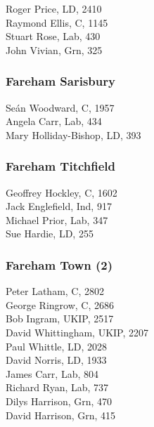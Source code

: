\documentclass[a4paper,openany,10pt]{book}
\begin{document}


Roger Price, LD, 2410\\
Raymond Ellis, C, 1145\\
Stuart Rose, Lab, 430\\
John Vivian, Grn, 325\\


\subsubsection*{Fareham Sarisbury}



Seán Woodward, C, 1957\\
Angela Carr, Lab, 434\\
Mary Holliday-Bishop, LD, 393\\


\subsubsection*{Fareham Titchfield}



Geoffrey Hockley, C, 1602\\
Jack Englefield, Ind, 917\\
Michael Prior, Lab, 347\\
Sue Hardie, LD, 255\\


\subsubsection*{Fareham Town (2)}



Peter Latham, C, 2802\\
George Ringrow, C, 2686\\
Bob Ingram, UKIP, 2517\\
David Whittingham, UKIP, 2207\\
Paul Whittle, LD, 2028\\
David Norris, LD, 1933\\
James Carr, Lab, 804\\
Richard Ryan, Lab, 737\\
Dilys Harrison, Grn, 470\\
David Harrison, Grn, 415\\
\end{document}
